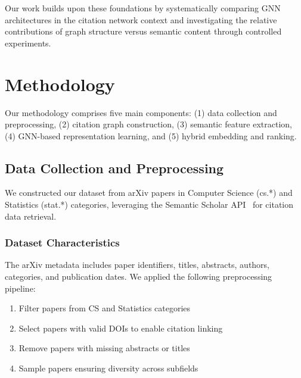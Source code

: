 \documentclass[pdflatex,sn-mathphys-num]{sn-jnl}
\theoremstyle{thmstyleone}%
\theoremstyle{thmstyletwo}%
\theoremstyle{thmstylethree}%
\begin{document}
Our work builds upon these foundations by systematically comparing GNN architectures in the citation network context and investigating the relative contributions of graph structure versus semantic content through controlled experiments.

\section{Methodology}\label{sec:method}

%     


Our methodology comprises five main components: (1) data collection and preprocessing, (2) citation graph construction, (3) semantic feature extraction, (4) GNN-based representation learning, and (5) hybrid embedding and ranking.

\subsection{Data Collection and Preprocessing}

We constructed our dataset from arXiv papers in Computer Science (cs.*) and Statistics (stat.*) categories, leveraging the Semantic Scholar API~\cite{lo2020s2orc} for citation data retrieval.

\subsubsection{Dataset Characteristics}

The arXiv metadata includes paper identifiers, titles, abstracts, authors, categories, and publication dates. We applied the following preprocessing pipeline:

\begin{enumerate}
    \item Filter papers from CS and Statistics categories
    \item Select papers with valid DOIs to enable citation linking
    \item Remove papers with missing abstracts or titles
    \item Sample papers ensuring diversity across subfields
\end{enumerate}
\end{document}
